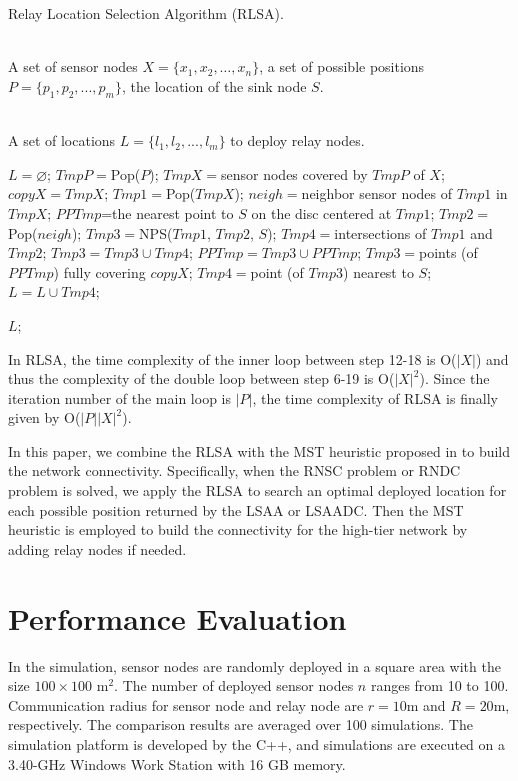 \documentclass[journal]{IEEEtran}
\begin{document}
\begin{algorithm}[htb]         \caption{Relay Location Selection Algorithm (RLSA).}             
\label{RLSA}                  
\begin{algorithmic}[1]                
\REQUIRE ~~\\                          
   A set of sensor nodes $X=\{x_1, x_2, \ldots, x_n\}$, a set of possible positions $P=\{p_1, p_2,...,p_m\}$, the location of the sink node $S$.

\ENSURE ~~\\                           
   A set of locations $L=\{l_1,l_2,...,l_m\}$ to deploy relay nodes.

\STATE $L=\varnothing$;
    \STATE $TmpP=$Pop($P$);
    \STATE $TmpX=$sensor nodes covered by $TmpP$ of $X$;
    \STATE $copyX=TmpX$;
        \STATE $Tmp1=$Pop($TmpX$);
        \STATE $neigh=$neighbor sensor nodes of $Tmp1$ in $TmpX$;
            \STATE $PPTmp$=the nearest point to $S$ on the disc centered at $Tmp1$;
        \ENDIF
            \STATE $Tmp2=$Pop($neigh$);
            \STATE $Tmp3=$NPS($Tmp1$, $Tmp2$, $S$);
            \STATE $Tmp4=$intersections of $Tmp1$ and $Tmp2$;
            \STATE $Tmp3=Tmp3\cup Tmp4$;
            \STATE $PPTmp=Tmp3\cup PPTmp$;
        \ENDWHILE
    \ENDWHILE
    \STATE $Tmp3=$points (of $PPTmp$) fully covering $copyX$;
    \STATE $Tmp4=$point (of $Tmp3$) nearest to $S$;
    \STATE $L=L\cup Tmp4$;
\ENDWHILE


\RETURN $L$;                
\end{algorithmic}

\end{algorithm}

In RLSA, the time complexity of the inner loop between step 12-18 is O($|X|$) and thus the complexity of the double loop between step 6-19 is O($|X|^2$). Since the iteration number of the main loop is $|P|$, the time complexity of RLSA is finally given by O($|P||X|^2$).

In this paper, we combine the RLSA with the MST heuristic proposed in \cite{Lloyd07} to build the network connectivity. Specifically, when the RNSC problem or RNDC problem is solved, we apply the RLSA to search an optimal deployed location for each possible position returned by the LSAA or LSAADC. Then the MST heuristic is employed to build the connectivity for the high-tier network by adding relay nodes if needed.
\section{Performance Evaluation}
In the simulation, sensor nodes are randomly deployed in a square area with the size $100\times 100$ m$^2$. The number of deployed sensor nodes $n$ ranges from 10 to 100. Communication radius for sensor node and relay node are $r=10$m and $R=20$m, respectively. The comparison results are averaged over 100 simulations. The simulation platform is developed by the C++, and simulations are executed on a 3.40-GHz Windows Work Station with 16 GB memory.
\end{document}
